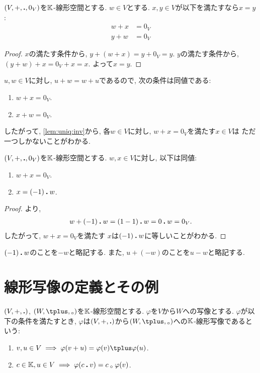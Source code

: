 \begin{lemma}
  \label{lem:uniq:inv}
  $(V,+,\mathbin{\boldsymbol{.}} ,0_V)$を$\mathbb{K}$-線形空間とする.
  $w\in V$とする.
  $x,y\in V$が以下を満たすなら$x=y$:
  \begin{align*}
    w+x&=0_V\\
    y+w&=0_V
  \end{align*}
\end{lemma}
\begin{proof}
  $x$の満たす条件から,
  $y+(w+x)=y+0_V=y$.
  $y$の満たす条件から,
  $(y+w)+x=0_V+x=x$.
  よって$x=y$.
\end{proof}
\begin{remark}
  $u,w\in V$に対し, $u+w=w+u$であるので,
  次の条件は同値である:
  \begin{enumerate}
  \item $w+x=0_V$.
  \item $x+w=0_V$.
  \end{enumerate}
  したがって, \cref{lem:uniq:inv}から,
  各$w\in V$に対し, $w+x=0_V$を満たす$x\in V$は
  ただ一つしかないことがわかる.
\end{remark}
\begin{prop}
  $(V,+,\mathbin{\boldsymbol{.}} ,0_V)$を$\mathbb{K}$-線形空間とする.
  $w,x\in V$に対し,
  以下は同値:
  \begin{enumerate}
  \item
    \label{prop:inverse:-1:item:1}
    $w+x=0_V$.
  \item
    \label{prop:inverse:-1:item:2}
    $x=(-1)\mathbin{\boldsymbol{.}} w$.    
  \end{enumerate}
\end{prop}
\begin{proof}
  より,
  \begin{align}
    w+(-1)\mathbin{\boldsymbol{.}} w=(1-1)\mathbin{\boldsymbol{.}} w=0\mathbin{\boldsymbol{.}} w=0_V.
  \end{align}
  したがって,
  $w+x=0_V$を満たす
  $x$は$(-1)\mathbin{\boldsymbol{.}} w$に等しいことがわかる.
\end{proof}

\begin{remark}
  $(-1)\mathbin{\boldsymbol{.}} w$のことを$-w$と略記する.
  また, $u+(-w)$のことを$u-w$と略記する.
\end{remark}




\section{線形写像の定義とその例}
\begin{definition}
  $(V,+,\mathbin{\boldsymbol{.}})$, $(W,\pplus,\aact)$を$\mathbb{K}$-線形空間とする.
  $\varphi$を$V$から$W$への写像とする.
  $\varphi$が以下の条件を満たすとき,
  $\varphi$は$(V,+,\mathbin{\boldsymbol{.}})$から$(W,\pplus,\aact)$への$\mathbb{K}$-線形写像であるという:
  \begin{enumerate}
    \item $v,u\in V\implies \varphi(v+u)=\varphi(v)\pplus\varphi(u)$.
    \item $c\in \mathbb{K}, u\in V\implies \varphi(c\mathbin{\boldsymbol{.}} v)=c\mathbin{{}_\circ}\varphi(v)$.
  \end{enumerate}
\end{definition}

